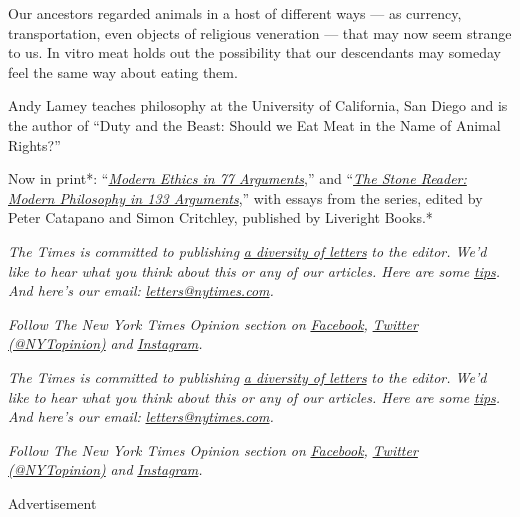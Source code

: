 Our ancestors regarded animals in a host of different ways --- as
currency, transportation, even objects of religious veneration --- that
may now seem strange to us. In vitro meat holds out the possibility that
our descendants may someday feel the same way about eating them.

Andy Lamey teaches philosophy at the University of California, San Diego
and is the author of ``Duty and the Beast: Should we Eat Meat in the
Name of Animal Rights?''

Now in print*: ``\emph{\href{http://bitly.com/1MW2kN3}{\emph{Modern
Ethics in 77 Arguments}}},'' and
``\emph{\href{http://bitly.com/1MW2kN3}{\emph{The Stone Reader: Modern
Philosophy in 133 Arguments}}},'' with essays from the series, edited by
Peter Catapano and Simon Critchley, published by Liveright Books.*

\emph{The Times is committed to publishing}
\href{https://www.nytimes.com/2019/01/31/opinion/letters/letters-to-editor-new-york-times-women.html}{\emph{a
diversity of letters}} \emph{to the editor. We'd like to hear what you
think about this or any of our articles. Here are some}
\href{https://help.nytimes.com/hc/en-us/articles/115014925288-How-to-submit-a-letter-to-the-editor}{\emph{tips}}\emph{.
And here's our email:}
\href{mailto:letters@nytimes.com}{\emph{letters@nytimes.com}}\emph{.}

\emph{Follow The New York Times Opinion section on}
\href{https://www.facebook.com/nytopinion}{\emph{Facebook}}\emph{,}
\href{http://twitter.com/NYTOpinion}{\emph{Twitter (@NYTopinion)}}
\emph{and}
\href{https://www.instagram.com/nytopinion/}{\emph{Instagram}}\emph{.}

\emph{The Times is committed to publishing}
\href{https://www.nytimes.com/2019/01/31/opinion/letters/letters-to-editor-new-york-times-women.html}{\emph{a
diversity of letters}} \emph{to the editor. We'd like to hear what you
think about this or any of our articles. Here are some}
\href{https://help.nytimes.com/hc/en-us/articles/115014925288-How-to-submit-a-letter-to-the-editor}{\emph{tips}}\emph{.
And here's our email:}
\href{mailto:letters@nytimes.com}{\emph{letters@nytimes.com}}\emph{.}

\emph{Follow The New York Times Opinion section on}
\href{https://www.facebook.com/nytopinion}{\emph{Facebook}}\emph{,}
\href{http://twitter.com/NYTOpinion}{\emph{Twitter (@NYTopinion)}}
\emph{and}
\href{https://www.instagram.com/nytopinion/}{\emph{Instagram}}\emph{.}

Advertisement


